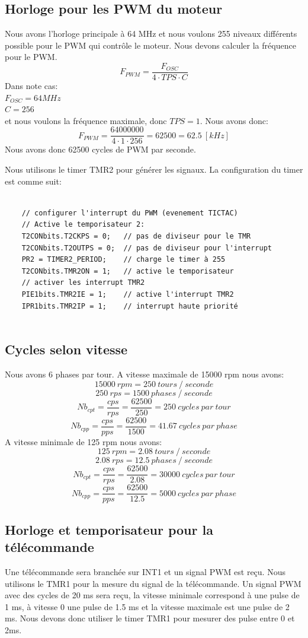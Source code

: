 \documentclass[fleqn, 11pt, a4paper]{article}
\begin{document}
  \subsection{Horloge pour les PWM du moteur}
  Nous avons l'horloge principale à 64 MHz et nous voulons 255 niveaux différents possible pour le PWM qui contrôle le moteur.
  Nous devons calculer la fréquence pour le PWM.
  $$F_{PWM} = \frac{F_{OSC}}{4 \cdot TPS \cdot C}$$
  Dans note cas:\\
  $F_{OSC} = 64 MHz$\\
  $C = 256$\\
  et nous voulons la fréquence maximale, donc $TPS = 1$.
  Nous avons donc:
  $$F_{PWM} = \frac{64000000}{4 \cdot 1 \cdot 256} = 62500 = 62.5\ [kHz]$$
  Nous avons donc 62500 cycles de PWM par seconde.
  
  Nous utilisons le timer TMR2 pour générer les signaux.
  La configuration du timer est comme suit:
  
  \begin{lstlisting}
  
    // configurer l'interrupt du PWM (evenement TICTAC)
    // Active le temporisateur 2:
    T2CONbits.T2CKPS = 0;   // pas de diviseur pour le TMR
    T2CONbits.T2OUTPS = 0;  // pas de diviseur pour l'interrupt
    PR2 = TIMER2_PERIOD;    // charge le timer à 255
    T2CONbits.TMR2ON = 1;   // active le temporisateur
    // activer les interrupt TMR2
    PIE1bits.TMR2IE = 1;    // active l'interrupt TMR2
    IPR1bits.TMR2IP = 1;    // interrupt haute priorité
  
  \end{lstlisting}
  
  \subsection{Cycles selon vitesse}
  Nous avons 6 phases par tour.
  A vitesse maximale de 15000 rpm nous avons:
  $$15000 \ rpm = 250\ tours\ /\ seconde$$
  $$ 250 \ rps = 1500\ phases\ /\ seconde$$
  $$Nb_{cpt} = \frac{cps}{rps} = \frac{62500}{250} = 250\ cycles\ par\ tour$$
  $$Nb_{cpp} = \frac{cps}{pps} = \frac{62500}{1500} = 41.67\ cycles\ par\ phase$$
  A vitesse minimale de 125 rpm nous avons:
  $$125 \ rpm = 2.08\ tours\ /\ seconde$$
  $$ 2.08 \ rps = 12.5\ phases\ /\ seconde$$
  $$Nb_{cpt} = \frac{cps}{rps} = \frac{62500}{2.08} = 30000\ cycles\ par\ tour$$
  $$Nb_{cpp} = \frac{cps}{pps} = \frac{62500}{12.5} = 5000\ cycles\ par\ phase$$
  
  \subsection{Horloge et temporisateur pour la télécommande}
  Une télécommande sera branchée sur INT1 et un signal PWM est reçu.
  Nous utilisons le TMR1 pour la mesure du signal de la télécommande.
  Un signal PWM avec des cycles de 20 ms sera reçu, la vitesse minimale correspond à une pulse de 1 ms, à vitesse 0 une pulse de 1.5 ms et la vitesse maximale est une pulse de 2 ms.
  Nous devons donc utiliser le timer TMR1 pour mesurer des pulse entre 0 et 2ms.
  
\end{document}
